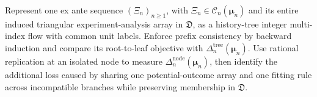 Represent one ex ante sequence \((\Xi_n)_{n\ge1}\), with \(\Xi_n\in\mathcal C_n(\boldsymbol\mu_n)\) and its entire induced triangular experiment-analysis array in \(\mathfrak D\), as a history-tree integer multi-index flow with common unit labels. Enforce prefix consistency by backward induction and compare its root-to-leaf objective with \(\Delta_n^{\mathrm{tree}}(\boldsymbol\mu_n)\). Use rational replication at an isolated node to measure \(\Delta_n^{\mathrm{node}}(\boldsymbol\mu_n)\), then identify the additional loss caused by sharing one potential-outcome array and one fitting rule across incompatible branches while preserving membership in \(\mathfrak D\).